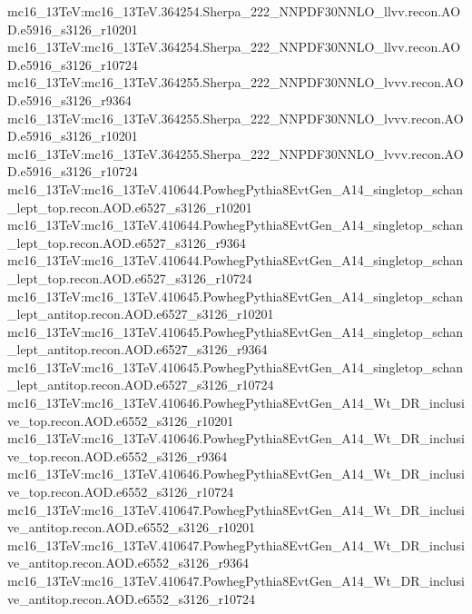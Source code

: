 { mc16\_13TeV:mc16\_13TeV.364254.Sherpa\_222\_NNPDF30NNLO\_llvv.recon.AOD.e5916\_s3126\_r10201\newline    
 mc16\_13TeV:mc16\_13TeV.364254.Sherpa\_222\_NNPDF30NNLO\_llvv.recon.AOD.e5916\_s3126\_r10724\newline    
 mc16\_13TeV:mc16\_13TeV.364255.Sherpa\_222\_NNPDF30NNLO\_lvvv.recon.AOD.e5916\_s3126\_r9364\newline    
 mc16\_13TeV:mc16\_13TeV.364255.Sherpa\_222\_NNPDF30NNLO\_lvvv.recon.AOD.e5916\_s3126\_r10201\newline    
 mc16\_13TeV:mc16\_13TeV.364255.Sherpa\_222\_NNPDF30NNLO\_lvvv.recon.AOD.e5916\_s3126\_r10724\newline    
 mc16\_13TeV:mc16\_13TeV.410644.PowhegPythia8EvtGen\_A14\_singletop\_schan\_lept\_top.recon.AOD.e6527\_s3126\_r10201\newline    
 mc16\_13TeV:mc16\_13TeV.410644.PowhegPythia8EvtGen\_A14\_singletop\_schan\_lept\_top.recon.AOD.e6527\_s3126\_r9364\newline    
 mc16\_13TeV:mc16\_13TeV.410644.PowhegPythia8EvtGen\_A14\_singletop\_schan\_lept\_top.recon.AOD.e6527\_s3126\_r10724\newline    
 mc16\_13TeV:mc16\_13TeV.410645.PowhegPythia8EvtGen\_A14\_singletop\_schan\_lept\_antitop.recon.AOD.e6527\_s3126\_r10201\newline    
 mc16\_13TeV:mc16\_13TeV.410645.PowhegPythia8EvtGen\_A14\_singletop\_schan\_lept\_antitop.recon.AOD.e6527\_s3126\_r9364\newline    
 mc16\_13TeV:mc16\_13TeV.410645.PowhegPythia8EvtGen\_A14\_singletop\_schan\_lept\_antitop.recon.AOD.e6527\_s3126\_r10724\newline   
 mc16\_13TeV:mc16\_13TeV.410646.PowhegPythia8EvtGen\_A14\_Wt\_DR\_inclusive\_top.recon.AOD.e6552\_s3126\_r10201\newline    
 mc16\_13TeV:mc16\_13TeV.410646.PowhegPythia8EvtGen\_A14\_Wt\_DR\_inclusive\_top.recon.AOD.e6552\_s3126\_r9364\newline    
 mc16\_13TeV:mc16\_13TeV.410646.PowhegPythia8EvtGen\_A14\_Wt\_DR\_inclusive\_top.recon.AOD.e6552\_s3126\_r10724\newline    
 mc16\_13TeV:mc16\_13TeV.410647.PowhegPythia8EvtGen\_A14\_Wt\_DR\_inclusive\_antitop.recon.AOD.e6552\_s3126\_r10201\newline    
 mc16\_13TeV:mc16\_13TeV.410647.PowhegPythia8EvtGen\_A14\_Wt\_DR\_inclusive\_antitop.recon.AOD.e6552\_s3126\_r9364   \newline 
 mc16\_13TeV:mc16\_13TeV.410647.PowhegPythia8EvtGen\_A14\_Wt\_DR\_inclusive\_antitop.recon.AOD.e6552\_s3126\_r10724   \newline 
}
